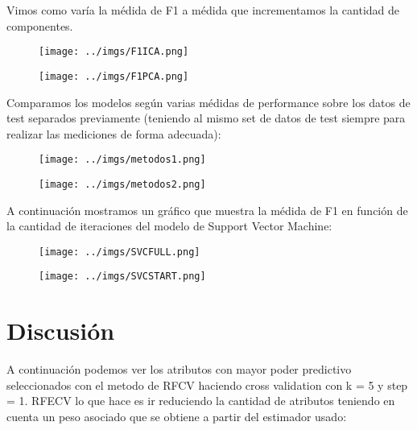 \documentclass[10pt, a4paper]{article}
\begin{document}
Vimos como varía la médida de F1 a médida que incrementamos la cantidad de componentes.
\begin{figure}[H]
\centering
\texttt{[image: ../imgs/F1ICA.png]}
\end{figure}

\begin{figure}[H]
\centering
\texttt{[image: ../imgs/F1PCA.png]}
\end{figure}

Comparamos los modelos según varias médidas de performance sobre los datos de test separados previamente (teniendo al mismo set de datos de test siempre para realizar las mediciones de forma adecuada):
\begin{figure}[H]
\centering
\texttt{[image: ../imgs/metodos1.png]}
\end{figure}

\begin{figure}[H]
\centering
\texttt{[image: ../imgs/metodos2.png]}
\end{figure}
A continuación mostramos un gráfico que muestra la médida de F1 en función de la cantidad de iteraciones del modelo de Support Vector Machine:
\begin{figure}[H]
\centering
\texttt{[image: ../imgs/SVCFULL.png]}
\end{figure}

\begin{figure}[H]
\centering
\texttt{[image: ../imgs/SVCSTART.png]}
\end{figure}

%

\section{Discusión}

 A continuación podemos ver los atributos con mayor poder predictivo seleccionados con el metodo de RFCV haciendo cross validation con k = 5 y step = 1. RFECV lo que hace es ir reduciendo la cantidad de atributos teniendo en cuenta un peso asociado que se obtiene a partir del estimador usado:
\end{document}
